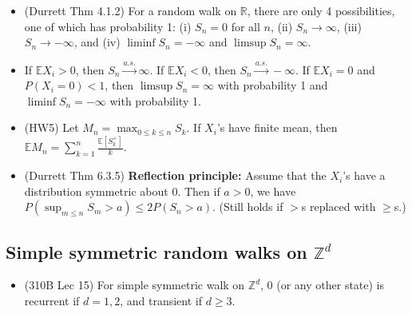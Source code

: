 \documentclass[twoside]{article}
\newcommand{\dis}{\displaystyle}
\newcommand\bbE{\mathbb{E}}
\newcommand\bbR{\mathbb{R}}
\newcommand\bbZ{\mathbb{Z}}
\newcommand\goesto{\rightarrow}
\begin{document}
\begin{itemize}
\item (Durrett Thm 4.1.2) For a random walk on $\bbR$, there are only 4 possibilities, one of which has probability 1: (i) $S_n = 0$ for all $n$, (ii) $S_n \goesto \infty$, (iii) $S_n \goesto -\infty$, and (iv) $\liminf S_n = -\infty$ and $\limsup S_n = \infty$.

\item If $\bbE X_i > 0$, then $S_n \stackrel{a.s.}{\goesto} \infty$. If $\bbE X_i < 0$, then $S_n \stackrel{a.s.}{\goesto} -\infty$. If $\bbE X_i = 0$ and $P(X_i = 0) < 1$, then $\limsup S_n = \infty$ with probability 1 and $\liminf S_n = -\infty$ with probability 1.

\item (HW5) Let $M_n = \dis\max_{0 \leq k \leq n} S_k$. If $X_i$'s have finite mean, then $\bbE M_n = \dis\sum_{k=1}^n \frac{\bbE [S_k^+]}{k}$.

\item (Durrett Thm 6.3.5) \textbf{Reflection principle:} Assume that the $X_i$'s have a distribution symmetric about 0. Then if $a > 0$, we have $P \left(\dis\sup_{m \leq n} S_m > a \right) \leq 2 P(S_n > a)$. (Still holds if $>$s replaced with $\geq$s.)

\end{itemize}

\subsection*{Simple symmetric random walks on $\bbZ^d$}
\begin{itemize}
\item (310B Lec 15) For simple symmetric walk on $\bbZ^d$, 0 (or any other state) is recurrent if $d = 1, 2$, and transient if $d \geq 3$.
\end{itemize}
\end{document}
